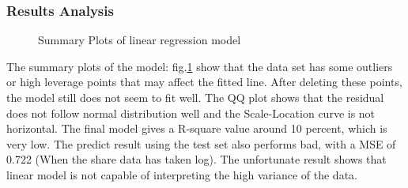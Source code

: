 \documentclass[letterpaper,12pt]{article}
\begin{document}
\subsubsection{Results Analysis}
\begin{figure}%
    \centering
    \qquad
    \caption{Summary Plots of linear regression model}%
    \label{fig7}%
\end{figure}
The summary plots of the model: fig.\ref{fig7} show that the data set has some outliers or high leverage points that may affect the fitted line. After deleting these points, the model still does not seem to fit well. The QQ plot shows that the residual does not follow normal distribution well and the Scale-Location curve is not horizontal. The final model gives a R-square value around 10 percent, which is very low. The predict result using the test set also performs bad, with a MSE of 0.722 (When the share data has taken log). The unfortunate result shows that linear model is not capable of interpreting the high variance of the data.
\end{document}
